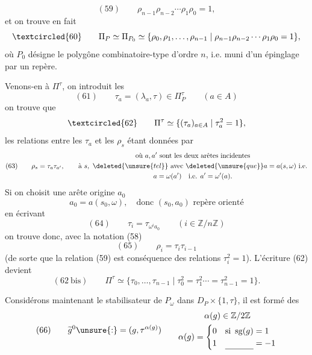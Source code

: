 \[
(59)\qquad \rho_{n-1}\rho_{n-2}\cdots\rho_1\rho_0=1,
\]
et on trouve en fait
\[
\textcircled{60}\qquad
\Pi_P\simeq\Pi_{P_0}\simeq
\{\rho_0,\rho_1,\ldots,\rho_{n-1}\mid
\rho_{n-1}\rho_{n-2}\cdots\rho_1\rho_0=1\},
\]
où $P_0$ désigne le polygône combinatoire-type d'ordre $n$, i.e. muni d'un épinglage par un repère.

Venons-en à $\Pi^\tau$, on introduit les
\[
(61)\qquad \tau_a=(\lambda_a,\tau)\in\Pi_P^\tau\qquad(a\in A)
\]
on trouve que
\[
\textcircled{62}\qquad \Pi^\tau\simeq\{(\tau_a)_{a\in A}\mid\tau_a^2=1\},
\]
les relations entre les $\tau_a$ et les $\rho_s$ étant données par
\[
(63)\qquad \rho_s=\tau_a\tau_{a'},\qquad
\begin{gathered}
\text{où }a,a'\text{ sont les deux arêtes incidentes}\\
\text{à }s,\ \deleted{\unsure{tel}}\text{ avec }\deleted{\unsure{que}}a=a(s,\omega)\text{ i.e.}\\
a=\omega(a')\quad\text{i.e. }a'=\omega'(a).
\end{gathered}
\]
Si on choisit  une arête origine $a_0$
\[
a_0=a(s_0,\omega),\quad\text{donc }(s_0,a_0)\text{ repère orienté}
\]
en écrivant
\[
(64)\qquad \tau_i=\tau_{\omega^i a_0}\qquad(i\in\mathbb Z/n\mathbb Z)
\]
on trouve donc, avec la notation (58)
\[
(65)\qquad \rho_i=\tau_i\tau_{i-1}
\]
(de sorte que la relation (59) est conséquence des relations $\tau_i^2=1$). L'écriture (62) devient
\[
(62\ \text{bis})\qquad
\Pi^\tau\simeq\{\tau_0,\ldots,\tau_{n-1}\mid
\tau_0^2=\tau_1^2\cdots=\tau_{n-1}^2=1\}.
\]

Considérons maintenant le stabilisateur de $P_\omega$ dans $D_P\times\{1,\tau\}$, il est formé des
\[
(66)\qquad
\widetilde g^0\unsure{:}= (g,\tau^{\alpha(g)})
\qquad
\begin{gathered}
\alpha(g)\in\mathbb Z/2\mathbb Z\\
\alpha(g)=
\begin{cases}
0&\text{si }\operatorname{sg}(g)=1\\
1&\underline{\phantom{\text{si }\operatorname{sg}(g)}}=-1
\end{cases}
\end{gathered}
\]
